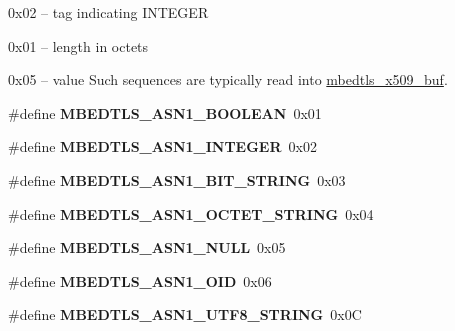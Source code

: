 \begin{DoxyItemize}
\item 0x02 -- tag indicating I\+N\+T\+E\+G\+ER
\item 0x01 -- length in octets
\item 0x05 -- value Such sequences are typically read into {\ttfamily \mbox{\hyperlink{group__x509__module_ga4d02c9e8e4e2934555e0d132cd2976dc}{mbedtls\+\_\+x509\+\_\+buf}}}. 
\end{DoxyItemize}\begin{DoxyCompactItemize}
\item 
\mbox{\label{group__asn1__module_ga1382980a474a765365d8f5c7bd63795a}} 
\#define {\bfseries M\+B\+E\+D\+T\+L\+S\+\_\+\+A\+S\+N1\+\_\+\+B\+O\+O\+L\+E\+AN}~0x01
\item 
\mbox{\label{group__asn1__module_ga6e8614f8937956c294fe791bc5ac6a7c}} 
\#define {\bfseries M\+B\+E\+D\+T\+L\+S\+\_\+\+A\+S\+N1\+\_\+\+I\+N\+T\+E\+G\+ER}~0x02
\item 
\mbox{\label{group__asn1__module_gafd5c5ecc822b7e2f4d2e64bf388fc559}} 
\#define {\bfseries M\+B\+E\+D\+T\+L\+S\+\_\+\+A\+S\+N1\+\_\+\+B\+I\+T\+\_\+\+S\+T\+R\+I\+NG}~0x03
\item 
\mbox{\label{group__asn1__module_ga080d1f82b0996a63c561541eb22a7d0f}} 
\#define {\bfseries M\+B\+E\+D\+T\+L\+S\+\_\+\+A\+S\+N1\+\_\+\+O\+C\+T\+E\+T\+\_\+\+S\+T\+R\+I\+NG}~0x04
\item 
\mbox{\label{group__asn1__module_gae26e36d787617e0b2dd067ccc342db0d}} 
\#define {\bfseries M\+B\+E\+D\+T\+L\+S\+\_\+\+A\+S\+N1\+\_\+\+N\+U\+LL}~0x05
\item 
\mbox{\label{group__asn1__module_gad87ad0570a31add4ecac6cc3694ca79a}} 
\#define {\bfseries M\+B\+E\+D\+T\+L\+S\+\_\+\+A\+S\+N1\+\_\+\+O\+ID}~0x06
\item 
\mbox{\label{group__asn1__module_gafc28060cb0e9b2be4f0960ad345a2e42}} 
\#define {\bfseries M\+B\+E\+D\+T\+L\+S\+\_\+\+A\+S\+N1\+\_\+\+U\+T\+F8\+\_\+\+S\+T\+R\+I\+NG}~0x0C
\item 
\mbox{\label{group__asn1__module_ga64ce838eb4418e69fe9aa251436203b3}} 

\end{DoxyCompactItemize}

